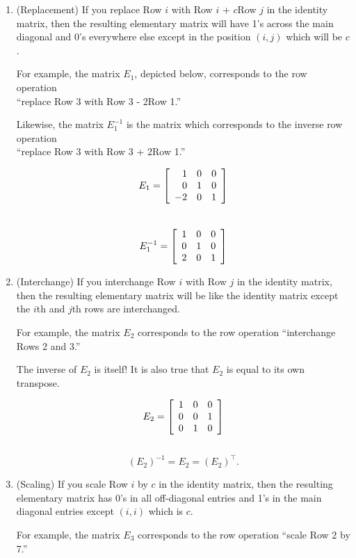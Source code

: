 \begin{enumerate}[!LIST!, start=1]
\item (Replacement) If you replace Row $i$ with Row $i$ + $c$Row $j$ in the identity matrix, then the resulting elementary matrix will have 1's across the main diagonal and 0's everywhere else except in the position $(i,j)$ which will be $c$.\vspace{-0.1 in}
\begin{multicols}{2} For example, the matrix $E_1$, depicted below, corresponds to the row operation\\ ``replace Row 3 with Row 3 - 2Row 1.''\columnbreak

Likewise, the matrix $E_1^{-1}$ is the matrix which corresponds to the inverse row operation\\ ``replace Row 3 with Row 3 + 2Row 1.''
\end{multicols}\vspace{-0.45 in}
\begin{multicols}{2}
\[E_1 = \mtx{rrr}{1&0&0\\0&1&0\\-2&0&1}\]\columnbreak
\mbox{}\\
\[E_1^{-1} = \mtx{rrr}{1&0&0\\0&1&0\\2&0&1}\] 
\mbox{}
\end{multicols}


\item (Interchange) If you interchange Row $i$ with Row $j$ in the identity matrix, then the resulting elementary matrix will be like the identity matrix except the $i$th and $j$th rows are interchanged. \vspace{-0.1 in}
\begin{multicols}{2}
For example, the matrix $E_2$ corresponds to the row operation ``interchange Rows 2 and 3.''\columnbreak

The inverse of $E_2$ is itself! It is also true that $E_2$ is equal to its own transpose.
\end{multicols}\vspace{-0.45 in}
\begin{multicols}{2}
\[E_2 = \mtx{rrr}{1&0&0\\0&0&1\\0&1&0}\]  \columnbreak
\mbox{}\\
\[(E_2)^{-1} = E_2 = (E_2)^\top .\]
\end{multicols} 

\item (Scaling) If you scale Row $i$ by $c$ in the identity matrix, then the resulting elementary matrix has 0's in all off-diagonal entries and 1's in the main diagonal entries except $(i,i)$ which is $c$.\vspace{-0.1 in}
\begin{multicols}{2}
For example, the matrix $E_3$ corresponds to the row operation ``scale Row 2 by 7.''\columnbreak


\end{multicols}
\end{enumerate}
